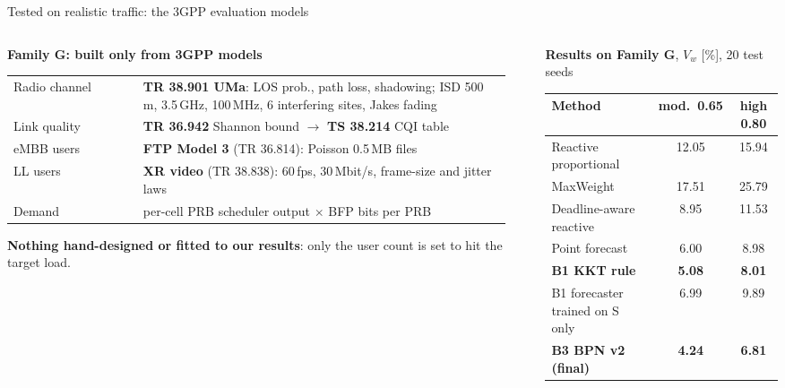 \documentclass[aspectratio=169,10pt,xcolor={table,dvipsnames}]{beamer}
\newcommand{\ours}{\rowcolor{good!14}}
\begin{document}
\begin{frame}{Tested on realistic traffic: the 3GPP evaluation models}
\begin{columns}[T]
\begin{column}{0.47\textwidth}
\textbf{\small Family G: built only from 3GPP models}\\[4pt]
\scriptsize
\setlength{\tabcolsep}{3pt}
\begin{tabular}{@{}>{\raggedright\arraybackslash}p{0.25\linewidth}>{\raggedright\arraybackslash}p{0.71\linewidth}@{}}
\toprule
Radio channel & \textbf{TR 38.901 UMa}: LOS prob., path loss, shadowing; ISD 500\,m, 3.5\,GHz, 100\,MHz, 6 interfering sites, Jakes fading \\
Link quality & \textbf{TR 36.942} Shannon bound $\rightarrow$ \textbf{TS 38.214} CQI table \\
eMBB users & \textbf{FTP Model 3} (TR 36.814): Poisson 0.5\,MB files \\
LL users & \textbf{XR video} (TR 38.838): 60\,fps, 30\,Mbit/s, frame-size and jitter laws \\
Demand & per-cell PRB scheduler output $\times$ BFP bits per PRB \\
\bottomrule
\end{tabular}
\vspace{0.3em}
\begin{takeaway}
\textbf{Nothing hand-designed or fitted to our results}: only the user count is set to hit the target load.
\end{takeaway}
\end{column}
\begin{column}{0.51\textwidth}
\textbf{\small Results on Family G}, $V_w$ [\%], 20 test seeds\\[3pt]
\scriptsize
\setlength{\tabcolsep}{4pt}
\begin{tabular}{lcc}
\toprule
Method & mod.\ 0.65 & high 0.80 \\
\midrule
Reactive proportional & 12.05 & 15.94 \\
MaxWeight & 17.51 & 25.79 \\
Deadline-aware reactive & 8.95 & 11.53 \\
Point forecast & 6.00 & 8.98 \\
\ours \textbf{B1 KKT rule} & \textbf{5.08} & \textbf{8.01} \\
B1 forecaster trained on S only & 6.99 & 9.89 \\
\ours \textbf{B3 BPN v2 (final)} & \textbf{4.24} & \textbf{6.81} \\

\end{tabular}
\end{column}
\end{columns}
\end{frame}
\end{document}
